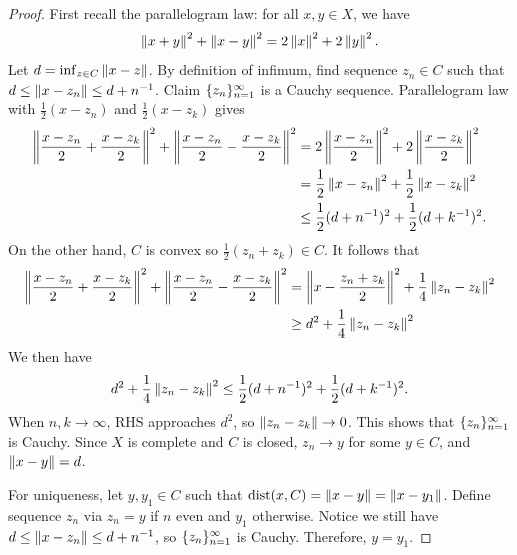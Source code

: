 \documentclass[a4paper]{article}
\begin{document}
\begin{proof}
  First recall the parallelogram law: for all $x, y \in X$, we have
  \[
    \left\lVert x + y\right\rVert^2 + \left\lVert x - y\right\rVert^2 = 2 \left\lVert x\right\rVert^2 + 2 \left\lVert y\right\rVert^2.
  \]
  Let $d = \inf_{z \in C} \left\lVert x - z\right\rVert$. By definition of infimum, find
  sequence $z_n \in C$ such that $d \leq \left\lVert x - z_n\right\rVert \leq d + n^{-1}$.
  Claim $\{ z_n \}_{n=1}^\infty$ is a Cauchy sequence. Parallelogram law with
  $\frac{1}{2}(x - z_n)$ and $\frac{1}{2}(x - z_k)$ gives
  \begin{align*}
    \left\lVert \frac{x - z_n}{2} + \frac{x - z_k}{2}\right\rVert^2
    + \left\lVert \frac{x - z_n}{2} - \frac{x - z_k}{2}\right\rVert^2
     & = 2 \left\lVert \frac{x - z_n}{2}\right\rVert^2 + 2 \left\lVert \frac{x - z_k}{2}\right\rVert^2 \\
     & = \frac{1}{2} \left\lVert x - z_n\right\rVert^2
    + \frac{1}{2} \left\lVert x - z_k\right\rVert^2                                   \\
     & \leq \frac{1}{2} (d + n^{-1})^2 + \frac{1}{2} (d + k^{-1})^2.
  \end{align*}
  On the other hand, $C$ is convex so $\frac{1}{2}(z_n + z_k) \in C$. It
  follows that
  \begin{align*}
    \left\lVert \frac{x - z_n}{2} + \frac{x - z_k}{2}\right\rVert^2
    + \left\lVert \frac{x - z_n}{2} - \frac{x - z_k}{2}\right\rVert^2
     & = \left\lVert x - \frac{z_n + z_k}{2}\right\rVert^2 + \frac{1}{4}
    \left\lVert z_n - z_k\right\rVert^2                                  \\
     & \geq d^2 + \frac{1}{4} \left\lVert z_n - z_k\right\rVert^2
  \end{align*}
  We then have
  \[
    d^2 + \frac{1}{4} \left\lVert z_n - z_k\right\rVert^2
    \leq \frac{1}{2} (d + n^{-1})^2 + \frac{1}{2} (d + k^{-1})^2.
  \]
  When $n, k \to \infty$, RHS approaches $d^2$, so $\left\lVert z_n - z_k\right\rVert \to
  0$. This shows that $\{ z_n \}_{n=1}^\infty$ is Cauchy. Since $X$ is complete and
  $C$ is closed, $z_n \to y$ for some $y \in C$, and $\left\lVert x - y\right\rVert = d$.

  For uniqueness, let $y, y_1 \in C$ such that $\operatorname{dist}(x, C) = \left\lVert x - y\right\rVert
  = \left\lVert x - y_1\right\rVert$. Define sequence $z_n$ via $z_n = y$ if $n$ even and
  $y_1$ otherwise. Notice we still have $d \leq \left\lVert x - z_n\right\rVert \leq d +
  n^{-1}$, so $\{ z_n \}_{n=1}^\infty$ is Cauchy. Therefore, $y = y_1$.


\end{proof}
\end{document}
